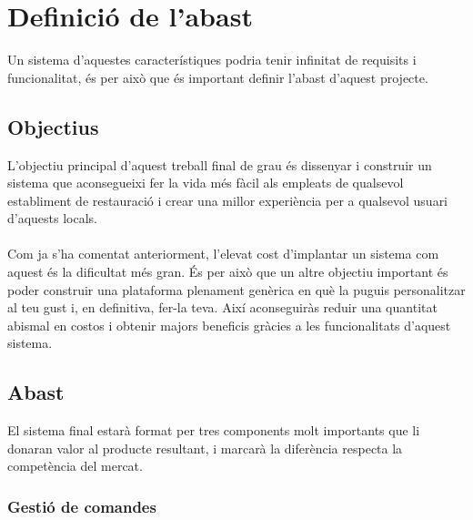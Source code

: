 
\chapter{Definició de l'abast} %

\label{Chapter3} %

Un sistema d’aquestes característiques podria tenir infinitat de requisits i funcionalitat, és per això que és important definir l’abast d’aquest projecte.


\section{Objectius}

L’objectiu principal d’aquest treball final de grau és dissenyar i construir un sistema que aconsegueixi fer la vida més fàcil als empleats de qualsevol establiment de restauració i crear una millor experiència per a qualsevol usuari d’aquests locals.
\\\\
Com ja s’ha comentat anteriorment, l’elevat cost d’implantar un sistema com aquest és la dificultat més gran. És per això que un altre objectiu important és poder construir una plataforma plenament genèrica en què la puguis personalitzar al teu gust i, en definitiva, fer-la teva. Així aconseguiràs reduir una quantitat abismal en costos i obtenir majors beneficis gràcies a les funcionalitats d’aquest sistema.


\section{Abast}

El sistema final estarà format per tres components molt importants que li donaran valor al producte resultant, i marcarà la diferència respecta la competència del mercat.

\subsection{Gestió de comandes}

